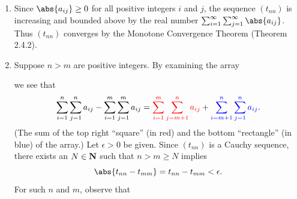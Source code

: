 \documentclass{lew98_solutions}
\begin{document}
\begin{solution}
    \begin{enumerate}
        \item Since \( \abs{a_{ij}} \geq 0 \) for all positive integers \( i \) and \( j \), the sequence \( (t_{nn}) \) is increasing and bounded above by the real number \( \sum_{i=1}^{\infty} \sum_{j=1}^{\infty} \abs{a_{ij}} \). Thus \( (t_{nn}) \) converges by the Monotone Convergence Theorem (Theorem 2.4.2).

        \item Suppose \( n > m \) are positive integers. By examining the array
        \begin{center}
        \end{center}
        we see that
        \[
            \sum_{i=1}^n \sum_{j=1}^n a_{ij} - \sum_{i=1}^m \sum_{j=1}^m a_{ij} = \textcolor{red}{\sum_{i=1}^m \sum_{j=m+1}^n a_{ij}} + \textcolor{blue}{\sum_{i=m+1}^n \sum_{j=1}^n a_{ij}}.
        \]
        (The sum of the top right ``square'' (in red) and the bottom ``rectangle'' (in blue) of the array.) Let \( \epsilon > 0 \) be given. Since \( (t_{nn}) \) is a Cauchy sequence, there exists an \( N \in \mathbf{N} \) such that \( n > m \geq N \) implies
        \[
            \abs{t_{nn} - t_{mm}} = t_{nn} - t_{mm} < \epsilon.
        \]
        For such \( n \) and \( m \), observe that

\end{enumerate}
\end{solution}
\end{document}
